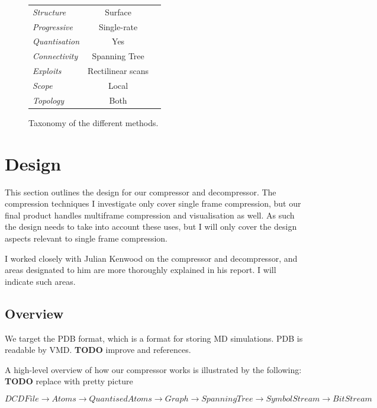 \documentclass{report}
\begin{document}
\begin{figure}
{\begin{tabular}{||l|c|c||}
  \hline

  \emph{Structure} & Surface & \\

  \emph{Progressive} & Single-rate & \\  

  \emph{Quantisation} & Yes & \\

  \emph{Connectivity} & Spanning Tree & \\

  \emph{Exploits} & Rectilinear scans & \\

  \emph{Scope} & Local & \\

  \emph{Topology} & Both & \\

  \hline
\end{tabular}
}
\caption{Taxonomy of the different methods.}\label{fig:taxonomy}
\end{figure}


\chapter{Design}

This section outlines the design for our compressor and decompressor. The
compression techniques I investigate only cover single frame compression, but
our final product handles multiframe compression and visualisation as well. As
such the design needs to take into account these uses, but I will only cover
the design aspects relevant to single frame compression.

I worked closely with Julian Kenwood on the compressor and decompressor, and
areas designated to him are more thoroughly explained in his report. I will
indicate such areas.

\section{Overview}

We target the PDB format, which is a format for storing MD simulations. PDB is
readable by VMD. \textbf{TODO} improve and references.

A high-level overview of how our compressor works is illustrated by the
following: \textbf{TODO} replace with pretty picture

\[ DCDFile \to Atoms \to QuantisedAtoms \to Graph \to SpanningTree \to SymbolStream \to
BitStream \]
\end{document}
